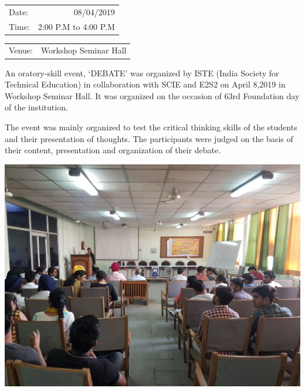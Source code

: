 \documentclass[12pt, a4 paper]{article}
\begin{document}
\begin{center}
\begin{multicols}{2}
\begin{tabular}{l r}
Date: & 08/04/2019\\ %
Time: & 2:00 P.M to 4:00 P.M \\ %
\end{tabular}
\columnbreak
\begin{tabular}{l r}
Venue: & Workshop Seminar Hall \\ %

\end{tabular}
\end{multicols}

\medskip
\justify
\begin{large}

 An oratory-skill event, ‘DEBATE’ was organized by ISTE (India Society for Technical Education) in collaboration with SCIE and E2S2 on April 8,2019 in Workshop Seminar Hall. It was organized on the occasion of 63rd Foundation day of the institution.
 
\bigskip

\begin{multicols}{2}
The event was mainly organized to test the critical thinking skills of the students and their presentation of thoughts. The participants were judged on the basis of their content, presentation and organization of their debate.
\columnbreak

\includegraphics[width=\linewidth]{image6.jpg}
  
\end{multicols} 


\end{large}
\end{center}
\end{document}
